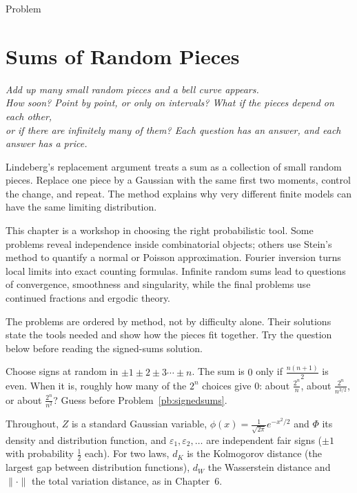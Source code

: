 \begin{exname}Problem\end{exname}
\renewcommand{\ocExName}{Problem}
\chapter{Sums of Random Pieces}\label{ch:harder}

\begin{center}\itshape
Add up many small random pieces and a bell curve appears.\\
How soon? Point by point, or only on intervals? What if the pieces depend on each other,\\
or if there are infinitely many of them? Each question has an answer, and each answer has a price.
\end{center}

Lindeberg's replacement argument treats a sum as a collection of small random pieces. Replace one piece by a Gaussian with the same first two moments, control the change, and repeat. The method explains why very different finite models can have the same limiting distribution.

This chapter is a workshop in choosing the right probabilistic tool. Some problems reveal independence inside combinatorial objects; others use Stein's method to quantify a normal or Poisson approximation. Fourier inversion turns local limits into exact counting formulas. Infinite random sums lead to questions of convergence, smoothness and singularity, while the final problems use continued fractions and ergodic theory.

The problems are ordered by method, not by difficulty alone. Their solutions state the tools needed and show how the pieces fit together. Try the question below before reading the signed-sums solution.

\begin{think}
Choose signs at random in $\pm1\pm2\pm3\cdots\pm n$. The sum is $0$ only if $\frac{n(n+1)}2$ is even. When it is, roughly how many of the $2^n$ choices
give $0$: about $\frac{2^n}n$, about $\frac{2^n}{n^{3/2}}$, or about $\frac{2^n}{n^2}$? Guess before Problem~\ref{pb:signedsums}.
\end{think}

Throughout, $Z$ is a standard Gaussian variable, $\phi(x)=\frac1{\sqrt{2\pi}}e^{-x^2/2}$ and $\Phi$ its density and distribution function, and
$\varepsilon_1,\varepsilon_2,\dots$ are independent fair signs ($\pm1$ with probability $\frac12$ each). For two laws, $d_K$ is the Kolmogorov distance
(the largest gap between distribution functions), $d_W$ the Wasserstein distance and $\|\cdot\|$ the total variation distance, as in Chapter~6.

